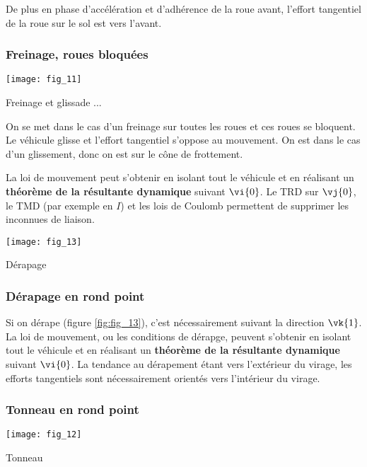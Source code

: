 De plus en phase d'accélération et d'adhérence de la roue avant, l'effort tangentiel de la roue sur le sol est vers l'avant. 

\subsubsection{Freinage, roues bloquées}

\begin{marginfigure}
\texttt{[image: fig\_11]}
\caption{Freinage et glissade ... \label{fig:fig_11}}
\end{marginfigure} 

On se met dans le cas d'un freinage sur toutes les roues et ces roues se bloquent. Le véhicule glisse et l'effort tangentiel s'oppose au mouvement. On est dans le cas d'un glissement, donc on est sur le cône de frottement. 

La loi de mouvement peut s'obtenir en isolant tout le véhicule et en réalisant un \textbf{théorème de la résultante dynamique} suivant $\vi{0}$. Le TRD sur $\vj{0}$, le TMD (par exemple en $I$) et les lois de Coulomb permettent de supprimer les inconnues de liaison.


\begin{marginfigure}
\texttt{[image: fig\_13]}
\caption{Dérapage \label{fig:fig_13}}
\end{marginfigure} 

\subsubsection{Dérapage en rond point}

Si on dérape (figure \ref{fig:fig_13}), c'est nécessairement suivant la direction $\vk{1}$. La loi de mouvement, ou les conditions de dérapge, peuvent s'obtenir en isolant tout le véhicule et en réalisant un \textbf{théorème de la résultante dynamique} suivant $\vi{0}$. 
La tendance au dérapement étant vers l'extérieur du virage, les efforts tangentiels sont nécessairement orientés vers l'intérieur du virage.


\subsubsection{Tonneau en rond point}

\begin{marginfigure}
\texttt{[image: fig\_12]}
\caption{Tonneau \label{fig:fig_12}}
\end{marginfigure} 


